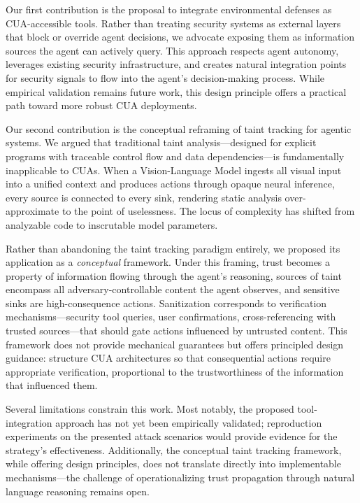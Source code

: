 Our first contribution is the proposal to integrate environmental defenses as CUA-accessible tools. Rather than treating security systems as external layers that block or override agent decisions, we advocate exposing them as information sources the agent can actively query. This approach respects agent autonomy, leverages existing security infrastructure, and creates natural integration points for security signals to flow into the agent's decision-making process. While empirical validation remains future work, this design principle offers a practical path toward more robust CUA deployments.

Our second contribution is the conceptual reframing of taint tracking for agentic systems. We argued that traditional taint analysis---designed for explicit programs with traceable control flow and data dependencies---is fundamentally inapplicable to CUAs. When a Vision-Language Model ingests all visual input into a unified context and produces actions through opaque neural inference, every source is connected to every sink, rendering static analysis over-approximate to the point of uselessness. The locus of complexity has shifted from analyzable code to inscrutable model parameters.

Rather than abandoning the taint tracking paradigm entirely, we proposed its application as a \emph{conceptual} framework. Under this framing, trust becomes a property of information flowing through the agent's reasoning, sources of taint encompass all adversary-controllable content the agent observes, and sensitive sinks are high-consequence actions. Sanitization corresponds to verification mechanisms---security tool queries, user confirmations, cross-referencing with trusted sources---that should gate actions influenced by untrusted content. This framework does not provide mechanical guarantees but offers principled design guidance: structure CUA architectures so that consequential actions require appropriate verification, proportional to the trustworthiness of the information that influenced them.

Several limitations constrain this work. Most notably, the proposed tool-integration approach has not yet been empirically validated; reproduction experiments on the presented attack scenarios would provide evidence for the strategy's effectiveness. Additionally, the conceptual taint tracking framework, while offering design principles, does not translate directly into implementable mechanisms---the challenge of operationalizing trust propagation through natural language reasoning remains open.


